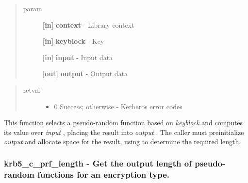 \documentclass[letterpaper,10pt,english]{sphinxmanual}
\begin{document}
\begin{quote}\begin{description}
\item[{param}] \leavevmode
\textbf{{[}in{]}} \textbf{context} - Library context

\textbf{{[}in{]}} \textbf{keyblock} - Key

\textbf{{[}in{]}} \textbf{input} - Input data

\textbf{{[}out{]}} \textbf{output} - Output data

\end{description}\end{quote}
\begin{quote}\begin{description}
\item[{retval}] \leavevmode\begin{itemize}
\item {} 
0   Success; otherwise - Kerberos error codes

\end{itemize}

\end{description}\end{quote}

This function selects a pseudo-random function based on \emph{keyblock} and computes its value over \emph{input} , placing the result into \emph{output} . The caller must preinitialize \emph{output} and allocate space for the result, using {\hyperref[appdev/refs/api/krb5_c_prf_length:c.krb5_c_prf_length]{}} to determine the required length.


\subsubsection{krb5\_c\_prf\_length -  Get the output length of pseudo-random functions for an encryption type.}
\label{appdev/refs/api/krb5_c_prf_length::doc}\label{appdev/refs/api/krb5_c_prf_length:krb5-c-prf-length-get-the-output-length-of-pseudo-random-functions-for-an-encryption-type}

\begin{fulllineitems}
\label{appdev/refs/api/krb5_c_prf_length:c.krb5_c_prf_length}
\end{fulllineitems}
\end{document}
